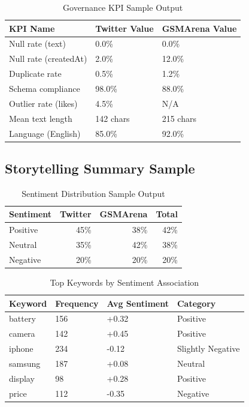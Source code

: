 \documentclass[12pt]{article}
\begin{document}
\begin{table}[H]
\centering
\caption{Governance KPI Sample Output}
\label{tab:governance_sample}
\begin{tabular}{p{5cm}p{3cm}p{3cm}}
\toprule
\textbf{KPI Name} & \textbf{Twitter Value} & \textbf{GSMArena Value} \\
\midrule
Null rate (text) & 0.0\% & 0.0\% \\
Null rate (createdAt) & 2.0\% & 12.0\% \\
Duplicate rate & 0.5\% & 1.2\% \\
Schema compliance & 98.0\% & 88.0\% \\
Outlier rate (likes) & 4.5\% & N/A \\
Mean text length & 142 chars & 215 chars \\
Language (English) & 85.0\% & 92.0\% \\
\bottomrule
\end{tabular}
\end{table}

\subsection{Storytelling Summary Sample}

\begin{table}[H]
\centering
\caption{Sentiment Distribution Sample Output}
\label{tab:sentiment_sample}
\begin{tabular}{lrrr}
\toprule
\textbf{Sentiment} & \textbf{Twitter} & \textbf{GSMArena} & \textbf{Total} \\
\midrule
Positive & 45\% & 38\% & 42\% \\
Neutral & 35\% & 42\% & 38\% \\
Negative & 20\% & 20\% & 20\% \\
\bottomrule
\end{tabular}
\end{table}

\begin{table}[H]
\centering
\caption{Top Keywords by Sentiment Association}
\label{tab:keywords_sample}
\begin{tabular}{llll}
\toprule
\textbf{Keyword} & \textbf{Frequency} & \textbf{Avg Sentiment} & \textbf{Category} \\
\midrule
battery & 156 & +0.32 & Positive \\
camera & 142 & +0.45 & Positive \\
iphone & 234 & -0.12 & Slightly Negative \\
samsung & 187 & +0.08 & Neutral \\
display & 98 & +0.28 & Positive \\
price & 112 & -0.35 & Negative \\
\bottomrule
\end{tabular}
\end{table}
\end{document}
